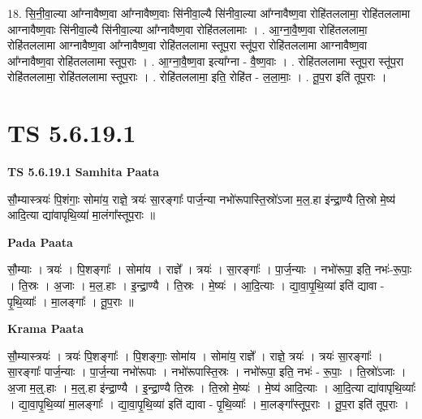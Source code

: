 \documentclass[17pt]{extarticle}
\begin{document}
18. सि॒नी॒वा॒ल्या आ᳚ग्नावैष्ण॒वा आ᳚ग्नावैष्ण॒वाः सि॑नीवा॒ल्यै सि॑नीवा॒ल्या आ᳚ग्नावैष्ण॒वा रोहि॑तललामा॒ रोहि॑तललामा आग्नावैष्ण॒वाः सि॑नीवा॒ल्यै सि॑नीवा॒ल्या आ᳚ग्नावैष्ण॒वा रोहि॑तललामाः । . आ॒ग्ना॒वै॒ष्ण॒वा रोहि॑तललामा॒ रोहि॑तललामा आग्नावैष्ण॒वा आ᳚ग्नावैष्ण॒वा रोहि॑तललामा स्तूप॒रा स्तू॑प॒रा रोहि॑तललामा आग्नावैष्ण॒वा आ᳚ग्नावैष्ण॒वा रोहि॑तललामा स्तूप॒राः । . आ॒ग्ना॒वै॒ष्ण॒वा इत्या᳚ग्ना - वै॒ष्ण॒वाः । . रोहि॑तललामा स्तूप॒रा स्तू॑प॒रा रोहि॑तललामा॒ रोहि॑तललामा स्तूप॒राः । . रोहि॑तललामा॒ इति॒ रोहि॑त - ल॒ला॒माः॒ । . तू॒प॒रा इति॑ तूप॒राः । \newline
\pagebreak
{}

\section{ TS 5.6.19.1 }

\textbf{TS 5.6.19.1 } \newline
\textbf{Samhita Paata} \newline

सौ॒म्यास्त्रयः॑ पि॒शंगाः॒ सोमा॑य॒ राज्ञे॒ त्रयः॑ सा॒रङ्गाः᳚ पार्ज॒न्या नभो॑रूपास्ति॒स्रो॑ऽजा म॒ल॒.हा इ॑न्द्रा॒ण्यै ति॒स्रो मे॒ष्य॑ आदि॒त्या द्या॑वापृथि॒व्या॑ मा॒लंगा᳚स्तूप॒राः ॥ \newline

\textbf{Pada Paata} \newline

सौ॒म्याः । त्रयः॑ । पि॒शङ्गाः᳚ । सोमा॑य । राज्ञे᳚ । त्रयः॑ । सा॒रङ्गाः᳚ । पा॒र्ज॒न्याः । नभो॑रूपा॒ इति॒ नभः॑-रू॒पाः॒ । ति॒स्रः । अ॒जाः । म॒ल॒.हाः । इ॒न्द्रा॒ण्यै । ति॒स्रः । मे॒ष्यः॑ । आ॒दि॒त्याः । द्या॒वा॒पृ॒थि॒व्या॑ इति॑ द्यावा - पृ॒थि॒व्याः᳚ । मा॒लङ्गाः᳚ । तू॒प॒राः ॥  \newline


\textbf{Krama Paata} \newline

सौ॒म्यास्त्रयः॑ । त्रयः॑ पि॒शङ्गाः᳚ । पि॒शङ्गाः॒ सोमा॑य । सोमा॑य॒ राज्ञे᳚ । राज्ञे॒ त्रयः॑ । त्रयः॑ सा॒रङ्गाः᳚ । सा॒रङ्गाः᳚ पार्ज॒न्याः । पा॒र्ज॒न्या नभो॑रूपाः । नभो॑रूपास्ति॒स्रः । नभो॑रूपा॒ इति॒ नभः॑ - रू॒पाः॒ । ति॒स्रो॑ऽजाः । अ॒जा म॒ल्॒.हाः । म॒ल्॒.हा इ॑न्द्रा॒ण्यै । इ॒न्द्रा॒ण्यै ति॒स्रः । ति॒स्रो मे॒ष्यः॑ । मे॒ष्य॑ आदि॒त्याः । आ॒दि॒त्या द्या॑वापृथि॒व्याः᳚ । द्या॒वा॒पृ॒थि॒व्या॑ मा॒लङ्गाः᳚ । द्या॒वा॒पृ॒थि॒व्या॑ इति॑ द्यावा - पृ॒थि॒व्याः᳚ । मा॒लङ्गा᳚स्तूप॒राः । तू॒प॒रा इति॑ तूप॒राः । \newline
\end{document}
